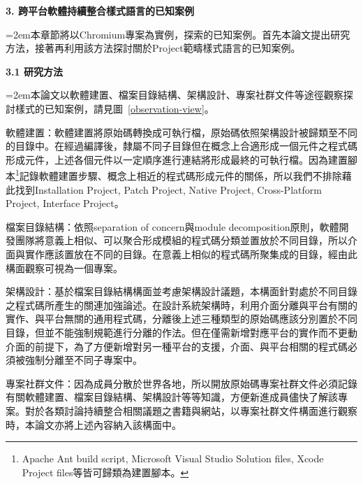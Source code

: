 \documentclass[10pt, twocolumn]{article}
\begin{document}

\begin{raggedright}\textbf{3. 跨平台軟體持續整合樣式語言的已知案例}\end{raggedright}

\parindent=2em本章節將以Chromium專案為實例，探索\cite{crossplatformcipatterns}的已知案例。首先本論文提出研究方法，接著再利用該方法探討關於Project範疇樣式語言的已知案例。

\begin{raggedright}\textbf{3.1 研究方法}\end{raggedright}

\parindent=2em本論文以軟體建置、檔案目錄結構、架構設計、專案社群文件等途徑觀察探討樣式的已知案例，請見圖~\ref{observation-view}。%
\begin{description}
\item 軟體建置：軟體建置將原始碼轉換成可執行檔，原始碼依照架構設計被歸類至不同的目錄中。在經過編譯後，隸屬不同子目錄但在概念上合適形成一個元件之程式碼形成元件，上述各個元件以一定順序進行連結將形成最終的可執行檔。因為建置腳本\footnote{Apache Ant build script, Microsoft Visual Studio Solution files, Xcode Project files等皆可歸類為建置腳本。}記錄軟體建置步驟、概念上相近的程式碼形成元件的關係，所以我們不排除藉此找到Installation Project, Patch Project, Native Project, Cross-Platform Project, Interface Project。
\item 檔案目錄結構：依照separation of concern與module decomposition原則，軟體開發團隊將意義上相似、可以聚合形成模組的程式碼分類並置放於不同目錄，所以介面與實作應該置放在不同的目錄。在意義上相似的程式碼所聚集成的目錄，經由此構面觀察可視為一個專案。
\item 架構設計：基於檔案目錄結構構面並考慮架構設計議題，本構面針對處於不同目錄之程式碼所產生的關連加強論述。在設計系統架構時，利用介面分離與平台有關的實作、與平台無關的通用程式碼，分離後上述三種類型的原始碼應該分別置於不同目錄，但並不能強制規範進行分離的作法。但在僅需新增對應平台的實作而不更動介面的前提下，為了方便新增對另一種平台的支援，介面、與平台相關的程式碼必須被強制分離至不同子專案中。
\item 專案社群文件：因為成員分散於世界各地，所以開放原始碼專案社群文件必須記錄有關軟體建置、檔案目錄結構、架構設計等等知識，方便新進成員儘快了解該專案。對於各類討論持續整合相關議題之書籍與網站，以專案社群文件構面進行觀察時，本論文亦將上述內容納入該構面中。
\end{description}
\end{document}

